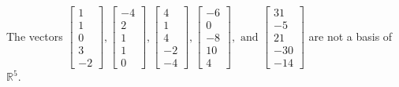 \begin{exercise}
\begin{exerciseStatement}
  \end{exerciseStatement}
  \begin{exerciseAnswer}
   The vectors \(\left[\begin{array}{r}
1 \\
1 \\
0 \\
3 \\
-2
\end{array}\right] , \left[\begin{array}{r}
-4 \\
2 \\
1 \\
1 \\
0
\end{array}\right] , \left[\begin{array}{r}
4 \\
1 \\
4 \\
-2 \\
-4
\end{array}\right] , \left[\begin{array}{r}
-6 \\
0 \\
-8 \\
10 \\
4
\end{array}\right] , \text{ and } \left[\begin{array}{r}
31 \\
-5 \\
21 \\
-30 \\
-14
\end{array}\right]\) 
  	 are not  a basis of \(\mathbb{R}^5\).
  


  \end{exerciseAnswer}
\end{exercise}